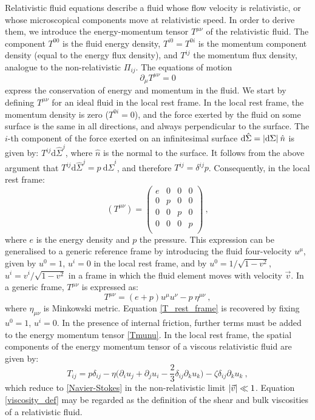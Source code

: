 Relativistic fluid equations describe a fluid whose flow velocity is relativistic, or whose microscopical components move at relativistic speed. In order to derive them, we introduce the energy-momentum tensor $T^{\mu\nu}$ of the relativistic fluid. The component $T^{00}$ is the fluid energy density, $T^{i0} = T^{0i}$ is the momentum component density (equal to the energy flux density), and $T^{ij}$ the momentum flux density, analogue to the non-relativistic $\Pi_{ij}$. The equations of motion
\begin{equation}
\partial_{\mu} T^{\mu\nu} = 0
\end{equation}
%
express the conservation of energy and momentum in the fluid.
We start by defining $T^{\mu\nu}$ for an ideal fluid in the local rest frame. In the local rest frame, the momentum density is zero ($T^{0i} = 0$), and the force exerted by the fluid on some surface is the same in all directions, and always perpendicular to the surface. The $i$-th component of the force exerted on an infinitesimal surface $\mathrm{d} \hat \Sigma = \abs{\mathrm{d}\Sigma} \: \hat n$ is given by:  $T^{ij} \mathrm{d} \hat \Sigma^j $, where $\hat n$ is the normal to the surface. It follows from the above argument that $T^{ij} \mathrm{d} \hat \Sigma^j = p \: \mathrm{d} \hat \Sigma^i $, and therefore $T^{ij} = \delta^{ij} p$. Consequently, in the local rest frame:
 \begin{equation}
 (T^{\mu\nu}) =
 \begin{pmatrix}
 e & 0 & 0 & 0 \\
 0 & p & 0 & 0 \\
 0 & 0 & p & 0 \\
 0 & 0 & 0 & p \\
 \end{pmatrix} \: ,
 \label{T_rest_frame}
 \end{equation}
 where $e$ is the energy density and $p$ the pressure.
 This expression can be generalised to a generic reference frame by introducing the fluid four-velocity $u^{\mu}$, given by $u^0 =1$, $u^i =0$ in the local rest frame, and by $u^0 = 1/\sqrt{1-v^2}$, $u^i = v^i/\sqrt{1-v^2}$ in a frame in which the fluid element moves with velocity $\vec v$. In a generic frame, $T^{\mu\nu}$ is expressed as:
  \begin{equation}
 T^{\mu\nu} = (e+p) u^{\mu} u^{\nu} - p \: \eta^{\mu\nu} \: ,
 \label{Tmunu}
 \end{equation}
 where $\eta_{\mu\nu}$ is Minkowski metric. Equation \ref{T_rest_frame} is recovered by fixing $u^0 =1$, $u^i =0$.
In the presence of internal friction, further terms must be added to the energy momentum tensor \ref{Tmunu}. In the local rest frame, the spatial components of the energy momentum tensor of a viscous relativistic fluid are given by:
\begin{equation}
T_{ij} = p \delta_{ij} - \eta \biggl( \partial_i u_j +\partial_j u_i - \frac{2}{3} \delta_{ij} \partial_k u_k \biggr) - \zeta \delta_{ij} \partial_k u_k \: ,
\label{viscosity_def}
\end{equation}
%
which reduce to \ref{Navier-Stokes} in the non-relativistic limit $\abs{\vec v} \ll 1$. Equation \ref{viscosity_def} may be regarded as the definition of the shear and bulk viscosities of a relativistic fluid.
 
